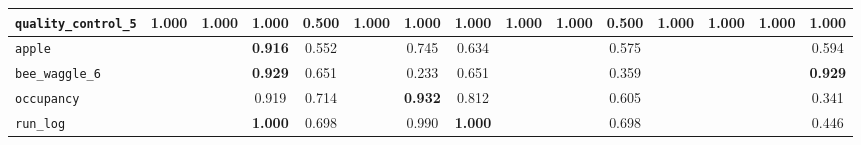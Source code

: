 \begin{tabular}{lcccccccccccccc}
\verb+quality_control_5+ & \textbf{1.000} & \textbf{1.000} & \textbf{1.000} & 0.500 & \textbf{1.000} & \textbf{1.000} & \textbf{1.000} & \textbf{1.000} & \textbf{1.000} & 0.500 & \textbf{1.000} & \textbf{1.000} & \textbf{1.000} & \textbf{1.000}\\
\midrule
\verb+apple+ &  &  & \textbf{0.916} & 0.552 &  & 0.745 & 0.634 &  &  & 0.575 &  &  &  & 0.594\\
\verb+bee_waggle_6+ &  &  & \textbf{0.929} & 0.651 &  & 0.233 & 0.651 &  &  & 0.359 &  &  &  & \textbf{0.929}\\
\verb+occupancy+ &  &  & 0.919 & 0.714 &  & \textbf{0.932} & 0.812 &  &  & 0.605 &  &  &  & 0.341\\
\verb+run_log+ &  &  & \textbf{1.000} & 0.698 &  & 0.990 & \textbf{1.000} &  &  & 0.698 &  &  &  & 0.446\\
\bottomrule
\end{tabular}
